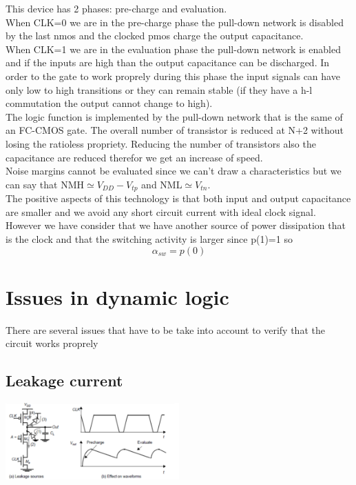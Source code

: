 This device has 2 phases: pre-charge and evaluation.\\
When CLK=0 we are in the pre-charge phase the pull-down network is disabled by the last nmos and the clocked pmos charge the output capacitance.\\
When CLK=1 we are in the evaluation phase the pull-down network is enabled and if the inputs are high than the output capacitance can be discharged. In order to the gate to work proprely during this phase the input signals can have only low to high transitions or they can remain stable (if they have a h-l commutation the output cannot change to high).\\
\vspace{5mm}
The logic function is implemented by the pull-down network that is the same of an FC-CMOS gate. The overall number of transistor is reduced at N+2 without losing the ratioless propriety. Reducing the number of transistors also the capacitance are reduced therefor we get an increase of speed.\\
\vspace{5mm}
Noise margins cannot be evaluated since we can't draw a characteristics but we can say that NMH$\simeq V_{DD}-V_{tp}$ and NML$\simeq V_{tn}$.\\
\vspace{5mm}
The positive aspects of this technology is that both input and output capacitance are smaller and we avoid any short circuit current with ideal clock signal.\\
However we have consider that we have another source of power dissipation that is the clock and that the switching activity is larger since p(1)=1 so 
\begin{equation}
\alpha_{sw}=p(0)
\end{equation}

\section{Issues in dynamic logic}
There are several issues that have to be take into account to verify that the circuit works proprely


\subsection{Leakage current}

\vspace{3mm}
\centering
\includegraphics[width=0.5\textwidth]{C9_2.png}\\
\raggedright
\vspace{3mm}

